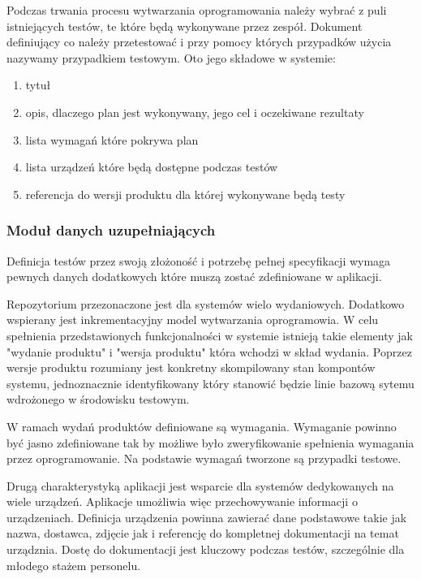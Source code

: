 Podczas trwania procesu wytwarzania oprogramowania należy wybrać z puli istniejących testów, te które będą wykonywane przez zespół. Dokument definiujący co należy przetestować i przy pomocy których przypadków użycia nazywamy przypadkiem testowym. Oto jego składowe w systemie:

\begin{enumerate}
  \item tytuł
  \item opis, dlaczego plan jest wykonywany, jego cel i oczekiwane rezultaty
  \item lista wymagań które pokrywa plan 
  \item lista urządzeń które będą dostępne podczas testów
  \item referencja do wersji produktu dla której wykonywane będą testy 
\end{enumerate}

\subsubsection{Moduł danych uzupełniających}

Definicja testów przez swoją złożoność i potrzebę pełnej specyfikacji wymaga pewnych danych dodatkowych które muszą zostać zdefiniowane w aplikacji.

Repozytorium przezonaczone jest dla systemów wielo wydaniowych. Dodatkowo wspierany jest inkrementacyjny model wytwarzania oprogramowia. W celu spełnienia przedstawionych funkcjonalności w systemie istnieją takie elementy jak "wydanie produktu" i "wersja produktu" która wchodzi w skład wydania. Poprzez wersje produktu rozumiany jest konkretny skompilowany stan kompontów systemu, jednoznacznie identyfikowany który stanowić będzie linie bazową sytemu wdrożonego w środowisku testowym. 

W ramach wydań produktów definiowane są wymagania. Wymaganie powinno być jasno zdefiniowane tak by możliwe było zweryfikowanie spełnienia wymagania przez oprogramowanie. Na podstawie wymagań tworzone są przypadki testowe.

Drugą charakterystyką aplikacji jest wsparcie dla systemów dedykowanych na wiele urządzeń. Aplikacje umożliwia więc przechowywanie informacji o urządzeniach. Definicja urządzenia powinna zawierać dane podstawowe takie jak nazwa, dostawca, zdjęcie jak i referencję do kompletnej dokumentacji na temat urządznia. Dostę do dokumentacji jest kluczowy podczas testów, szczególnie dla młodego stażem personelu.

